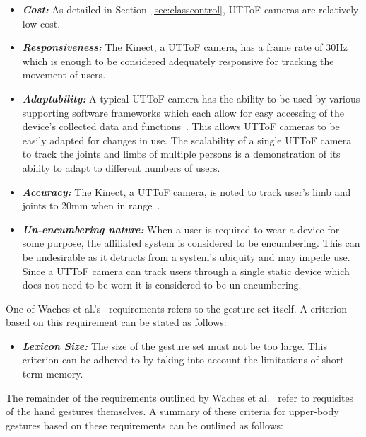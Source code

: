 \documentclass[manuscript, review, screen]{acmart}
\begin{document}
\begin{itemize}
\item  \textit{\textbf{Cost:}} As detailed in Section~\ref{sec:classcontrol}, \ac{UTToF} cameras are relatively low cost.
\item \textit{\textbf{Responsiveness:}} The Kinect, a \ac{UTToF} camera, has a frame rate of 30Hz~\cite{Livingston2012} which is enough to be considered adequately responsive for tracking the movement of users.
\item \textit{\textbf{Adaptability:}} A typical \ac{UTToF} camera has the ability to be used by various supporting software frameworks which each allow for easy accessing of the device's collected data and functions~\cite{Goth2011}.
This allows \ac{UTToF} cameras to be easily adapted for changes in use.
The scalability of a single \ac{UTToF} camera  to track the joints and limbs of multiple persons is a demonstration of its ability to adapt to different numbers of users.
\item \textit{\textbf{Accuracy:}} The Kinect, a \ac{UTToF} camera, is noted to track user's limb and joints to 20mm when in range~\cite{Marquardt2011}. 
\item \textit{\textbf{Un-encumbering nature:}} When a user is required to wear a device for some purpose, the affiliated system is considered to be encumbering.
This can be undesirable as it detracts from a system's ubiquity and may impede use. 
Since a \ac{UTToF} camera can track users through a single static device which does not need to be worn it is considered to be un-encumbering.\\ 
\end{itemize}

One of Waches et al.'s~\citeyearpar{Wachs2011} requirements refers to the gesture set itself.
A criterion based on this requirement can be stated as follows:

\begin{itemize}
\item \textit{\textbf{Lexicon Size:}}  The size of the gesture set must not be too large.
This criterion can be adhered to by taking into account the limitations of short term memory.\\ 
\end{itemize}

The remainder of the requirements outlined by Waches et al.~\citeyearpar{Wachs2011} refer to requisites of the hand gestures themselves.
A summary of these criteria for upper-body gestures based on these requirements can be outlined as follows:
\end{document}
